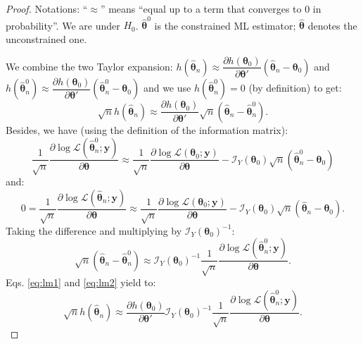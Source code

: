 \documentclass[
  11pt,
]{book}
\theoremstyle{definition}
\theoremstyle{definition}
\theoremstyle{definition}
\theoremstyle{definition}
\theoremstyle{remark}
\begin{document}
\begin{proof}
Notations: ``\(\approx\)'' means ``equal up to a term that converges to 0 in probability''. We are under \(H_0\). \(\hat{\boldsymbol\theta}^0\) is the constrained ML estimator; \(\hat{\boldsymbol\theta}\) denotes the unconstrained one.

We combine the two Taylor expansion: \(h(\hat{\boldsymbol\theta}_n) \approx \dfrac{\partial h(\boldsymbol\theta_0)}{\partial \boldsymbol\theta'}(\hat{\boldsymbol\theta}_n - \boldsymbol\theta_0)\) and \(h(\hat{\boldsymbol\theta}_n^0) \approx \dfrac{\partial h(\boldsymbol\theta_0)}{\partial \boldsymbol\theta'}(\hat{\boldsymbol\theta}_n^0 - \boldsymbol\theta_0)\) and we use \(h(\hat{\boldsymbol\theta}_n^0)=0\) (by definition) to get:
\begin{equation}
\sqrt{n}h(\hat{\boldsymbol\theta}_n) \approx \dfrac{\partial h(\boldsymbol\theta_0)}{\partial \boldsymbol\theta'}\sqrt{n}(\hat{\boldsymbol\theta}_n - \hat{\boldsymbol\theta}^0_n). \label{eq:lm1}
\end{equation}
Besides, we have (using the definition of the information matrix):
\begin{equation}
\frac{1}{\sqrt{n}}\frac{\partial \log \mathcal{L}(\hat{\boldsymbol\theta}^0_n;\mathbf{y})}{\partial \boldsymbol\theta} \approx
\frac{1}{\sqrt{n}}\frac{\partial \log \mathcal{L}(\boldsymbol\theta_0;\mathbf{y})}{\partial \boldsymbol\theta} - \mathcal{I}_Y(\boldsymbol\theta_0)\sqrt{n}(\hat{\boldsymbol\theta}^0_n-\boldsymbol\theta_0) \label{eq:lm29}
\end{equation}
and:
\begin{equation}
0=\frac{1}{\sqrt{n}}\frac{\partial \log \mathcal{L}(\hat{\boldsymbol\theta}_n;\mathbf{y})}{\partial \boldsymbol\theta} \approx
\frac{1}{\sqrt{n}}\frac{\partial \log \mathcal{L}(\boldsymbol\theta_0;\mathbf{y})}{\partial \boldsymbol\theta} - \mathcal{I}_Y(\boldsymbol\theta_0)\sqrt{n}(\hat{\boldsymbol\theta}_n-\boldsymbol\theta_0).\label{eq:lm30}
\end{equation}
Taking the difference and multiplying by \(\mathcal{I}_Y(\boldsymbol\theta_0)^{-1}\):
\begin{equation}
\sqrt{n}(\hat{\boldsymbol\theta}_n-\hat{\boldsymbol\theta}_n^0) \approx
\mathcal{I}_Y(\boldsymbol\theta_0)^{-1}\frac{1}{\sqrt{n}}\frac{\partial \log \mathcal{L}(\hat{\boldsymbol\theta}^0_n;\mathbf{y})}{\partial \boldsymbol\theta}.\label{eq:lm2}
\end{equation}
Eqs. \eqref{eq:lm1} and \eqref{eq:lm2} yield to:
\begin{equation}
\sqrt{n}h(\hat{\boldsymbol\theta}_n) \approx \dfrac{\partial h(\boldsymbol\theta_0)}{\partial \boldsymbol\theta'} \mathcal{I}_Y(\boldsymbol\theta_0)^{-1}\frac{1}{\sqrt{n}}\frac{\partial \log \mathcal{L}(\hat{\boldsymbol\theta}^0_n;\mathbf{y})}{\partial \boldsymbol\theta}.\label{eq:lm3}
\end{equation}


\end{proof}
\end{document}
